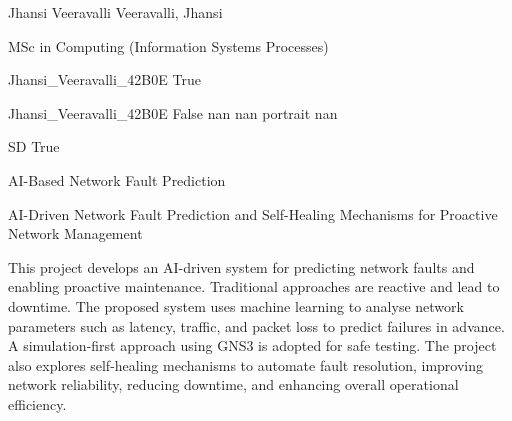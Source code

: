 
\begingroup{}\relax



\def\Key{Jhansi_Veeravalli_42B0E}

{Jhansi Veeravalli}
{Veeravalli, Jhansi}

{MSc in Computing (Information Systems Processes)}

{Jhansi_Veeravalli_42B0E}
{True}

{Jhansi_Veeravalli_42B0E}
{False}
{nan}
{nan}
{portrait}
{nan}

{SD}
{True}

{AI-Based Network Fault Prediction}

{AI-Driven Network Fault Prediction and Self-Healing Mechanisms for Proactive Network Management}

{This project develops an AI-driven system for predicting network faults and enabling proactive maintenance. Traditional approaches are reactive and lead to downtime. The proposed system uses machine learning to analyse network parameters such as latency, traffic, and packet loss to predict failures in advance. A simulation-first approach using GNS3 is adopted for safe testing. The project also explores self-healing mechanisms to automate fault resolution, improving network reliability, reducing downtime, and enhancing overall operational efficiency.}

